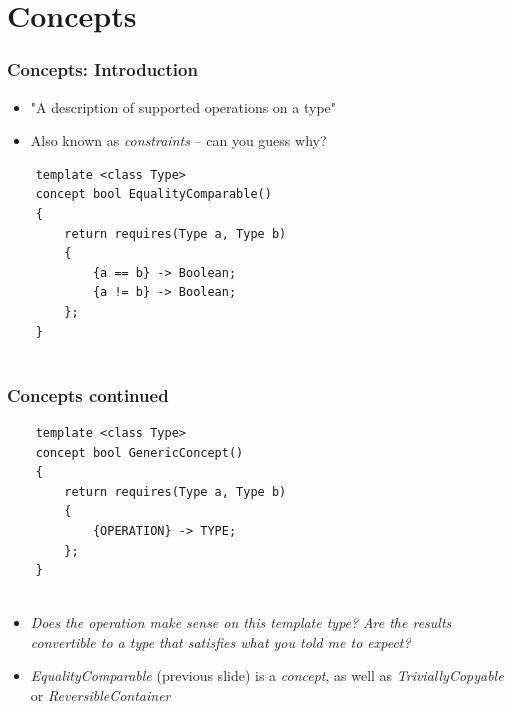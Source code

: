 \documentclass{beamer}
\begin{document}

\section{Concepts}

\begin{frame}[fragile]
\frametitle{Concepts: Introduction}
\begin{itemize}
\item "A description of supported operations on a type"
\item Also known as \emph{constraints} -- can you guess why?
\end{itemize}

\begin{lstlisting}
    template <class Type>
    concept bool EqualityComparable() 
    {
    	return requires(Type a, Type b) 
    	{
    		{a == b} -> Boolean;
    		{a != b} -> Boolean; 
    	}; 
    }
 
\end{lstlisting}
\end{frame}


\begin{frame}[fragile]
\frametitle{Concepts continued}
\begin{lstlisting}
    template <class Type>
    concept bool GenericConcept() 
    {
    	return requires(Type a, Type b) 
    	{
    		{OPERATION} -> TYPE;
    	}; 
    }
 
\end{lstlisting}
        
        \begin{itemize}
        \item \textit{Does the operation make sense on this template type?} \textit{Are the results convertible to a type that satisfies what you told me to expect?}
        \item \textsl{EqualityComparable} (previous slide) is a \emph{concept}, as well as \textsl{TriviallyCopyable} or \textsl{ReversibleContainer}
        \end{itemize}
\end{frame}
\end{document}
